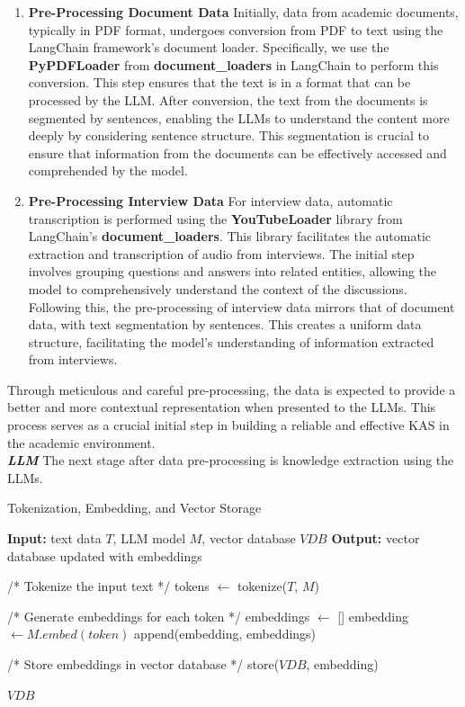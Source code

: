 \documentclass[runningheads]{llncs}
\begin{document}
\begin{enumerate}
    \item \textbf{Pre-Processing Document Data}
    Initially, data from academic documents, typically in PDF format, undergoes conversion from PDF to text using the LangChain framework's document loader. Specifically, we use the \textbf{PyPDFLoader} from \textbf{document\_loaders} in LangChain to perform this conversion. This step ensures that the text is in a format that can be processed by the LLM. After conversion, the text from the documents is segmented by sentences, enabling the LLMs to understand the content more deeply by considering sentence structure. This segmentation is crucial to ensure that information from the documents can be effectively accessed and comprehended by the model.
    
    \item \textbf{Pre-Processing Interview Data} For interview data, automatic transcription is performed using the \textbf{YouTubeLoader} library from LangChain's  \textbf{document\_loaders}. This library facilitates the automatic extraction and transcription of audio from interviews. The initial step involves grouping questions and answers into related entities, allowing the model to comprehensively understand the context of the discussions. Following this, the pre-processing of interview data mirrors that of document data, with text segmentation by sentences. This creates a uniform data structure, facilitating the model's understanding of information extracted from interviews.
\end{enumerate}

Through meticulous and careful pre-processing, the data is expected to provide a better and more contextual representation when presented to the LLMs. This process serves as a crucial initial step in building a reliable and effective KAS in the academic environment. \\
\newpage
\textbf{\textit{LLM}} The next stage after data pre-processing is knowledge extraction using the LLMs.

\begin{algorithm}
    \caption{Tokenization, Embedding, and Vector Storage}
    \begin{algorithmic}[1]
    \State \textbf{Input:} text data $T$, LLM model $M$, vector database $VDB$
    \State \textbf{Output:} vector database updated with embeddings
    
    \State /* Tokenize the input text */
    \State tokens $\gets$ tokenize($T$, $M$)
    
    \State /* Generate embeddings for each token */
    \State embeddings $\gets$ []
        \State embedding $\gets M.embed(token)$
        \State append(embedding, embeddings)
    \EndFor
    
    \State /* Store embeddings in vector database */
        \State store($VDB$, embedding)
    \EndFor
    
    \State \Return $VDB$
    \end{algorithmic}
\end{algorithm}
\end{document}
